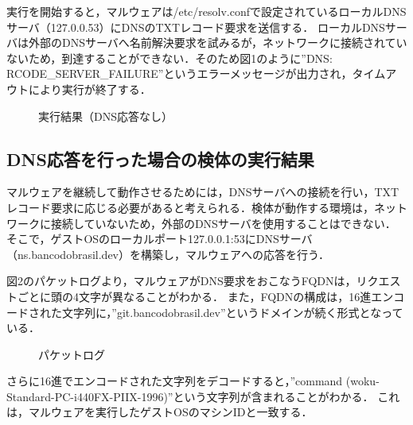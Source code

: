 \documentclass[submit,techreq,noauthor]{eco}	%
\begin{document}
実行を開始すると，マルウェアは/etc/resolv.confで設定されているローカルDNSサーバ（127.0.0.53）にDNSのTXTレコード要求を送信する．
ローカルDNSサーバは外部のDNSサーバへ名前解決要求を試みるが，ネットワークに接続されていないため，到達することができない．そのため図1のように”DNS: RCODE\_SERVER\_FAILURE”というエラーメッセージが出力され，タイムアウトにより実行が終了する．

\begin{figure}[H]
	\centering
	\caption{実行結果（DNS応答なし）}
	\label{fig:001}
\end{figure}

\subsection{DNS応答を行った場合の検体の実行結果}
マルウェアを継続して動作させるためには，DNSサーバへの接続を行い，TXTレコード要求に応じる必要があると考えられる．検体が動作する環境は，ネットワークに接続していないため，外部のDNSサーバを使用することはできない．
そこで，ゲストOSのローカルポート127.0.0.1:53にDNSサーバ（ns.bancodobrasil.dev）を構築し，マルウェアへの応答を行う．

図2のパケットログより，マルウェアがDNS要求をおこなうFQDNは，リクエストごとに頭の4文字が異なることがわかる．
また，FQDNの構成は，16進エンコードされた文字列に，”git.bancodobrasil.dev”というドメインが続く形式となっている．
\begin{figure}[H]
	\centering
	\caption{パケットログ}
	\label{fig:packet}
\end{figure}

さらに16進でエンコードされた文字列をデコードすると，”command (woku-Standard-PC-i440FX-PIIX-1996)”という文字列が含まれることがわかる．
これは，マルウェアを実行したゲストOSのマシンIDと一致する．\\
\end{document}
